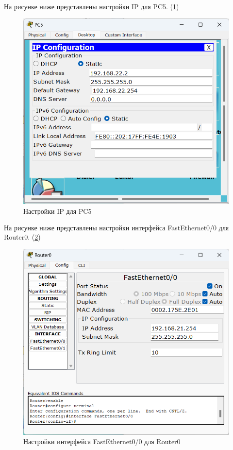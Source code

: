 \documentclass[14pt]{extarticle}
\begin{document}
На рисунке ниже представлены настройки IP для PC5. (\ref{img:PC5})

\begin{figure}[H]
    \centering
    \includegraphics[width=1.0\linewidth]{PC5.png}
    \caption{Настройки IP для PC5\label{img:PC5}}
\end{figure}

На рисунке ниже представлены настройки интерфейса FastEthernet0/0 для Router0. (\ref{img:Router0FastEthernet0})

\begin{figure}[H]
    \centering
    \includegraphics[width=1.0\linewidth]{Router0FastEthernet0.png}
    \caption{Настройки интерфейса FastEthernet0/0 для Router0\label{img:Router0FastEthernet0}}
\end{figure}
\end{document}
